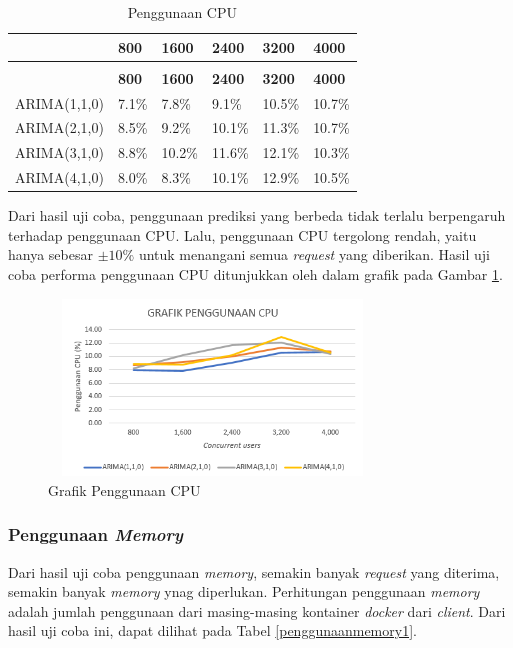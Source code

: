 \begin{longtable}{|p{}|p{}|p{}|p{}|p{}|p{}|}
	\caption{Penggunaan CPU} \label{penggunaancpu} \\
	\hline
	& \textbf{800} & \textbf{1600} & \textbf{2400} & \textbf{3200} & \textbf{4000} \\ \hline
	\endfirsthead
	\caption[]{Penggunaan CPU} \\
	\hline
	& \textbf{800} & \textbf{1600} & \textbf{2400} & \textbf{3200} & \textbf{4000} \\ \hline
	\endhead
	\endfoot
	\endlastfoot
	
	ARIMA(1,1,0) & 7.1\% & 7.8\% & 9.1\% & 10.5\% & 10.7\% \\ \hline
	ARIMA(2,1,0) & 8.5\% & 9.2\% & 10.1\% & 11.3\% & 10.7\% \\ \hline
	ARIMA(3,1,0) & 8.8\% & 10.2\% & 11.6\% & 12.1\% & 10.3\% \\ \hline
	ARIMA(4,1,0) & 8.0\% & 8.3\% & 10.1\% & 12.9\% & 10.5\% \\ \hline
	
\end{longtable}

Dari hasil uji coba, penggunaan prediksi yang berbeda tidak terlalu berpengaruh terhadap penggunaan CPU. Lalu, penggunaan CPU tergolong rendah, yaitu hanya sebesar $\pm 10 \%$ untuk menangani semua \textit{request} yang diberikan. Hasil uji coba performa penggunaan CPU ditunjukkan oleh dalam grafik pada Gambar \ref{gcpuusage}.

\begin{figure}[H]
	\centering
	\includegraphics[width=8.7cm,height=4.7cm]{Images/C-5/cpuusage.png}
	\caption{Grafik Penggunaan CPU}
	\label{gcpuusage}
\end{figure}

\subsubsection{Penggunaan \textit{Memory}}
Dari hasil uji coba penggunaan \textit{memory}, semakin banyak \textit{request} yang diterima, semakin banyak \textit{memory} ynag diperlukan. Perhitungan penggunaan \textit{memory} adalah jumlah penggunaan dari masing-masing kontainer \textit{docker} dari \textit{client}. Dari hasil uji coba ini, dapat dilihat pada Tabel \ref{penggunaanmemory1}.

